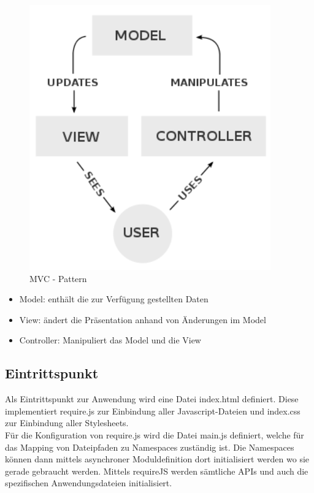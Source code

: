 \begin{figure}[H]
  \centering  
  \includegraphics[scale=0.5]{img/mvc.png}
  \caption{MVC - Pattern}
  \label{fig:mapping}
\end{figure}

\begin{itemize}
  \setlength{\itemsep}{1pt}
  \setlength{\parskip}{0pt}
  \setlength{\parsep}{0pt}
  
  \item Model: enthält die zur Verfügung gestellten Daten
  \item View: ändert die Präsentation anhand von Änderungen im Model
  \item Controller: Manipuliert das Model und die View 
\end{itemize}


\subsection{Eintrittspunkt}
\label{subsec:eintrittspunkt}

Als Eintrittspunkt zur Anwendung wird eine Datei index.html definiert. Diese implementiert require.js zur Einbindung aller Javascript-Dateien und index.css zur Einbindung aller Stylesheets. \\
Für die Konfiguration von require.js wird die Datei main.js definiert, welche für das Mapping von Dateipfaden zu Namespaces zuständig ist. Die Namespaces können dann mittels asynchroner Moduldefinition dort initialisiert werden wo sie gerade gebraucht werden. Mittels requireJS werden sämtliche APIs und auch die spezifischen Anwendungsdateien initialisiert.

